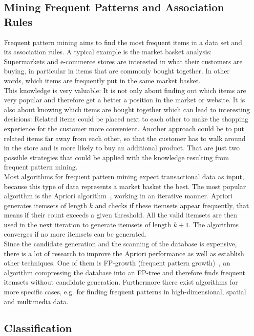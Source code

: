 \subsection{Mining Frequent Patterns and Association Rules}
Frequent pattern mining aims to find the most frequent items in a data set and its association rules. A typical example is the market basket analysis: Supermarkets and e-commerce stores are interested in what their customers are buying, in particular in items that are commonly bought together. In other words, which items are frequently put in the same market basket. 
\\
This knowledge is very valuable: It is not only about finding out which items are very popular and therefore get a better a position in the market or website. It is also about knowing which items are bought together which can lead to interesting desicions: Related items could be placed next to each other to make the shopping experience for the customer more convenient. Another approach could be to put related items far away from each other, so that the customer has to walk around in the store and is more likely to buy an additional product. That are just two possible strategies that could be applied with the knowledge resulting from frequent pattern mining.
\\
Most algorithms for frequent pattern mining expect transactional data as input, because this type of data represents a market basket the best. The most popular algorithm is the Apriori algorithm~\parencite{apriori}, working in an iterative manner. Apriori generates itemsets of length $k$ and checks if these itemsets appear frequently, that means if their count exceeds a given threshold. All the valid itemsets are then used in the next iteration to generate itemsets of length $k+1$. The algorithms converges if no more itemsets can be generated.
\\
Since the candidate generation and the scanning of the database is expensive, there is a lot of research to improve the Apriori performance as well as establish other techniques. One of them is FP-growth (frequent pattern growth)~\parencite{fpgrowth}, an algorithm compressing the database into an FP-tree and therefore finds frequent itemsets without candidate generation. Furthermore there exist algorithms for more specific cases, e.g. for finding frequent patterns in high-dimensional, spatial and multimedia data.

\subsection{Classification}

